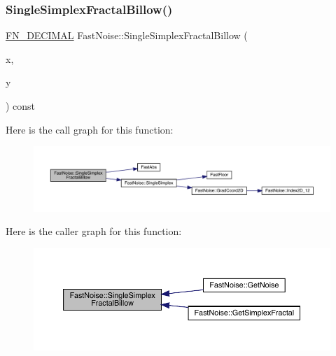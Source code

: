\subsubsection{\texorpdfstring{Single\+Simplex\+Fractal\+Billow()}{SingleSimplexFractalBillow()}\hspace{0.1cm}{\footnotesize\ttfamily [1/2]}}
{\footnotesize\ttfamily \mbox{\hyperlink{_fast_noise_8h_a75a9ef6d2541c4921815b885bfd449c3}{F\+N\+\_\+\+D\+E\+C\+I\+M\+AL}} Fast\+Noise\+::\+Single\+Simplex\+Fractal\+Billow (\begin{DoxyParamCaption}\item[{\mbox{\hyperlink{_fast_noise_8h_a75a9ef6d2541c4921815b885bfd449c3}{F\+N\+\_\+\+D\+E\+C\+I\+M\+AL}}}]{x,  }\item[{\mbox{\hyperlink{_fast_noise_8h_a75a9ef6d2541c4921815b885bfd449c3}{F\+N\+\_\+\+D\+E\+C\+I\+M\+AL}}}]{y }\end{DoxyParamCaption}) const\hspace{0.3cm}{\ttfamily [private]}}

Here is the call graph for this function\+:
\nopagebreak
\begin{figure}[H]
\begin{center}
\leavevmode
\includegraphics[width=350pt]{class_fast_noise_aa23a186cee489865781430d344cad11d_cgraph}
\end{center}
\end{figure}
Here is the caller graph for this function\+:
\nopagebreak
\begin{figure}[H]
\begin{center}
\leavevmode
\includegraphics[width=350pt]{class_fast_noise_aa23a186cee489865781430d344cad11d_icgraph}
\end{center}
\end{figure}
\mbox{\label{class_fast_noise_a6dd57ba17192a085544452db30caaf64}} 
